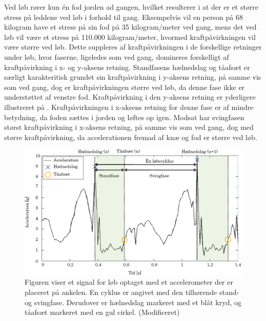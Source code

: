 Ved løb rører kun én fod jorden ad gangen, hvilket resulterer i at der er et større stress på leddene ved løb i forhold til gang. Eksempelvis vil en person på 68 kilogram have et stress på sin fod på 35 kilogram/meter ved gang, mens det ved løb vil være et stress på 110.000 kilogram/meter, hvormed kraftpåvirkningen vil være større ved løb. \citep{Adelaar1986}
Dette suppleres af kraftpåvirkningen i de forskellige retninger under løb, hvor faserne, ligeledes som ved gang, domineres forskelligt af kraftpåvirkning i x- og y-aksens retning. \newline 
Standfasens hælnedslag og tåafsæt er særligt karakteritisk grundet sin kraftpåvirkning i y-aksens retning, på samme vis som ved gang, dog er kraftpåvirkningen større ved løb, da denne fase ikke er understøttet af venstre fod. Kraftpåvirkning i den y-aksens retning er yderligere illustreret på .\newline
Kraftpåvirkningen i x-aksens retning for denne fase er af mindre betydning, da foden sættes i jorden og løftes op igen. 
Modsat har svingfasen størst kraftpåvirkning i x-aksens retning, på samme vis som ved gang, dog med større kraftpåvirkning, da accelerationen fremad af knæ og fod er større ved løb. \citep{Rueterbories2010} 

\begin{figure}[H]
	\centering
	\includegraphics[scale=0.55]{figures/bProblemloesning/loeb_skolebog.png}
	\caption{Figuren viser et signal for løb optaget med et accelerometer der er placeret på ankelen. En cyklus er angivet med den tilhørende stand- og svingfase. Derudover er hælnedslag markeret med et blåt kryd, og tåafsæt markeret med en gul cirkel. \citep{WeyandKelly2001} (Modificeret)}
	\label{fig:loeb_skolebog}
\end{figure}

